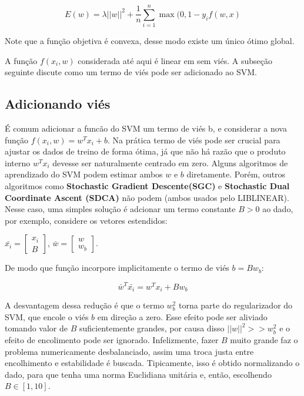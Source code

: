 \documentclass[]{book}
\begin{document}
\begin{equation}
  E(w)  = \lambda||w||^2+\frac{1}{n} \sum_{i=1}^{n}\max(0,1-y_if(w,x)
\end{equation}

Note que a função objetiva é convexa, desse modo existe um único ótimo
global.

A função \(f(x_i,w)\) considerada até aqui é linear em sem viés. A
subseção seguinte discute como um termo de viés pode ser adicionado ao
SVM.

\subsection{Adicionando viés}\label{adicionando-vies}

É comum adicionar a funcão do SVM um termo de viés b, e considerar a
nova função \(f(x_i,w) = w^{T}x_i + b\). Na prática termo de viés pode
ser crucial para ajustar os dados de treino de forma ótima, já que não
há razão que o produto interno \(w^{T}x_i\) devesse ser naturalmente
centrado em zero. Alguns algoritmos de aprendizado do SVM podem estimar
ambos \(w\) e \(b\) diretamente. Porém, outros algoritmos como
\textbf{Stochastic Gradient Descente(SGC)} e \textbf{Stochastic Dual
Coordinate Ascent (SDCA)} não podem (ambos usados pelo LIBLINEAR). Nesse
caso, uma simples solução é adcionar um termo constante \(B > 0\) ao
dado, por exemplo, considere os vetores estendidos:

\(\bar{x_i}=\begin{bmatrix} x_i \\ B \end{bmatrix}\),
\(\bar{w}=\begin{bmatrix} w \\ w_b\end{bmatrix}\).

De modo que função incorpore implicitamente o termo de viés
\(b = Bw_b\):

\begin{equation}
  \bar{w}^T\bar{x_i} = w^Tx_i + Bw_b
\end{equation}

A desvantagem dessa redução é que o termo \(w^2_b\) torna parte do
regularizador do SVM, que encole o viés \(b\) em direção a zero. Esse
efeito pode ser aliviado tomando valor de \(B\) suficientemente grandes,
por causa disso \(||w||^2 >> w^2_b\) e o efeito de encolimento pode ser
ignorado. Infelizmente, fazer \(B\) muito grande faz o problema
numericamente desbalanciado, assim uma troca justa entre encolhimento e
estabilidade é buscada. Tipicamente, isso é obtido normalizando o dado,
para que tenha uma norma Euclidiana unitária e, então, escolhendo
\(B \in [1,10]\).
\end{document}

